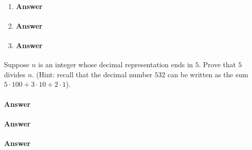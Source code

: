 \begin{enumerate}
    \item \todo{}
        \paragraph{Answer}
        \todo{}

    \item \todo{}
        \paragraph{Answer}
        \todo{}

    \item \todo{}
        \paragraph{Answer}
        \todo{}

\end{enumerate}

\collab{\todo{}}

Suppose $n$ is an integer whose decimal representation ends in $5$.  Prove that
$5$ divides $n$. (Hint: recall that the decimal number $532$ can be written as
the sum $5\cdot 100 + 3 \cdot 10 + 2 \cdot 1$).

\paragraph{Answer}
\todo{}

\collab{\todo{}}

\todo{}

\paragraph{Answer}
\todo{}

\collab{\todo{}}

\todo{}

\paragraph{Answer}
\todo{}

